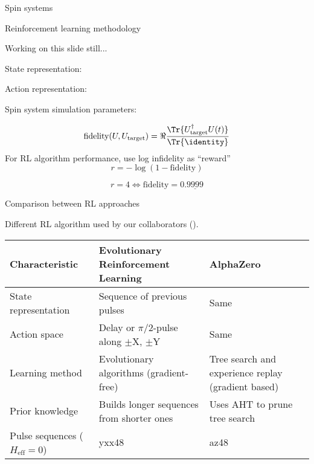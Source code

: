 \documentclass{beamer}
\begin{document}
\begin{frame}{Spin systems}


\end{frame}

\begin{frame}{Reinforcement learning methodology}


Working on this slide still...

State representation:

Action representation:

Spin system simulation parameters:


\[
    \text{fidelity}(U, U_\text{target}) = \Re{
        \frac{\Tr{U_\text{target}^\dagger U(t)}}{\Tr{\identity}}
    }
\]
For RL algorithm performance, use log infidelity as ``reward''
\[
    r = -\log \left( 1 - \text{fidelity} \right)
\]

\[
r = 4 \iff \text{fidelity} = 0.\underline{9999}
\]


\end{frame}

\begin{frame}{Comparison between RL approaches}

Different RL algorithm used by our collaborators (\cite{peng2021deep}).

\begin{table}
\centering
\begin{footnotesize}
\begin{tabular}{p{}|p{}|p{}}
    Characteristic & Evolutionary Reinforcement Learning & AlphaZero \\
    \hline
    State representation & Sequence of previous pulses & Same \\
    \hline
    Action space & Delay or $\pi/2$-pulse along $\pm$X, $\pm$Y & Same \\
    \hline
    Learning method & Evolutionary algorithms (gradient-free) & Tree search and experience replay (gradient based) \\
    \hline
    Prior knowledge & Builds longer sequences from shorter ones & Uses AHT to prune tree search \\
    \hline
    Pulse sequences ($H_\text{eff} = 0$) & yxx48 & az48
\end{tabular}
\end{footnotesize}
\end{table}

\end{frame}
\end{document}
